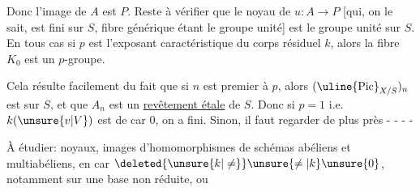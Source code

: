 Donc l'image de $A$ est $P$. Reste à vérifier
que le noyau de  $u:A\to P$  [qui, on
le sait, est fini sur $S$, fibre générique étant
le groupe unité] est le groupe unité sur $S$.
En tous cas   si
$p$ est l'exposant caractéristique du corps résiduel
$k$, alors la fibre $K_0$ est un $p$-groupe.


Cela résulte facilement du fait que si
$n$ est premier à $p$, alors $(\uline{\mathrm{Pic}}_{X/S})_n$ est
  sur $S$, et que  $A_n$ est 
un \uline{revêtement étale} de $S$. Donc si $p=1$
i.e. $k(\unsure{v|V})$ est de car $0$, on a fini.
Sinon, il faut regarder de plus près  - - - -

À étudier: noyaux, images d'homomorphismes de
schémas abéliens et multiabéliens, en car $\deleted{\unsure{k|\ne}} \unsure{\ne|k} \unsure{0}$,
notamment sur une base non réduite, ou
